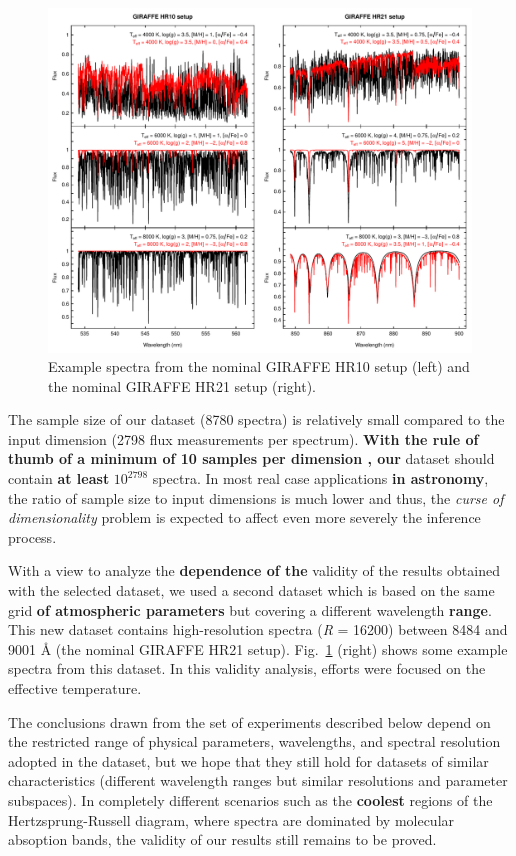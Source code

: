 \documentclass[a4paper,fleqn,usenatbib]{mnras}
\begin{document}
\begin{figure}
	\centering\includegraphics[width=\textwidth]{fig02_espectros_HR10_HR21.pdf}
	\caption{Example spectra from the nominal GIRAFFE 
		HR10 setup (left) and the nominal GIRAFFE HR21 setup (right).}
	\label{fig:ejemplosEspectros}
\end{figure}

The sample size of our dataset (8780 spectra) is relatively
small compared to the input dimension (2798 flux measurements 
per spectrum). {\bf With the rule of thumb of a minimum of 10 samples per dimension  
	\citep{jain:00}, our} dataset should contain {\bf at least} $10^{2798}$ spectra.
In most real case applications {\bf in astronomy}, the ratio of sample size to input 
dimensions is much lower and thus, the \textit{curse of dimensionality} 
problem is expected to affect even more severely the inference process. 

With a view to analyze the {\bf dependence of the} validity of the results obtained with the 
selected dataset, we used a second dataset which is based on the same 
grid {\bf of atmospheric parameters} but covering a different wavelength {\bf range}. This new dataset contains 
high-resolution spectra (\textit{R} = 16200) between 8484 and 9001 
{\AA} (the nominal GIRAFFE HR21 setup). 
Fig.~\ref{fig:ejemplosEspectros} (right) shows some example spectra from 
this dataset. In this validity analysis, efforts were focused on the 
effective temperature.

The conclusions drawn from the set of experiments described below
depend on the restricted range of physical parameters, wavelengths,
and spectral resolution adopted in the dataset, but we hope that they
still hold for datasets of similar characteristics (different
wavelength ranges but similar resolutions and parameter subspaces). In
completely different scenarios such as the {\bf coolest} regions of the
Hertzsprung-Russell diagram, where spectra are dominated by molecular
absoption bands, the validity of our results still remains to be proved.
\end{document}
